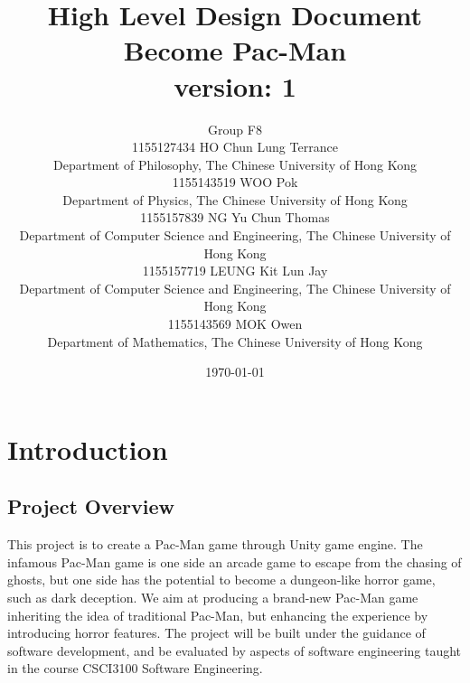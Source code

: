 \documentclass[11pt]{article}
\title{High Level Design Document\\Become Pac-Man\\version: 1}
\author{Group F8\\1155127434 HO Chun Lung Terrance\\
Department of Philosophy, The Chinese University of Hong Kong\\1155143519 WOO Pok\\
Department of Physics, The Chinese University of Hong Kong\\1155157839 NG Yu Chun Thomas\\
Department of Computer Science and Engineering, The Chinese University of Hong Kong\\1155157719 LEUNG Kit Lun Jay\\
Department of Computer Science and Engineering, The Chinese University of Hong Kong\\1155143569 MOK Owen\\
Department of Mathematics, The Chinese University of Hong Kong}
\date{\today}
\begin{document}
\maketitle
\tableofcontents
\newpage
\section{Introduction}
\subsection{Project Overview}
\par This project is to create a Pac-Man game through Unity game engine. The infamous Pac-Man game is one side an arcade game to escape from the chasing of ghosts, but one side has the potential to become a dungeon-like horror game, such as dark deception. We aim at producing a brand-new Pac-Man game inheriting the idea of traditional Pac-Man, but enhancing the experience by introducing horror features. The project will be built under the guidance of software development, and be evaluated by aspects of software engineering taught in the course CSCI3100 Software Engineering.
\end{document}
